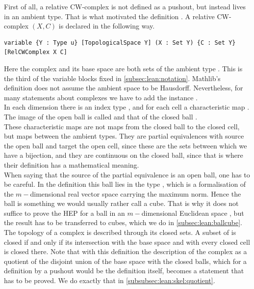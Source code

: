 \documentclass[11pt, a4paper, english]{article}
\theoremstyle{plain}
\theoremstyle{definition}
\theoremstyle{remark}
\numberwithin{equation}{section}
\numberwithin{theorem}{section}
\begin{document}
First of all, a relative CW-complex is not defined as a pushout, but instead lives in an ambient type. That is what motivated the definition . A relative CW-complex $(X,C)$ is declared in the following way. 
\begin{verbatim}
variable {Y : Type u} [TopologicalSpace Y] (X : Set Y) {C : Set Y} [RelCWComplex X C]
\end{verbatim}
Here the complex  and its base space  are both sets of the ambient type . This is the third of the variable blocks fixed in \cref{subsec:lean:notation}. Mathlib's definition does not assume the ambient space to be Hausdorff. Nevertheless, for many statements about complexes we have to add the instance \lean{[T2Space Y]}. \\
In each dimension there is an index type , and for each cell a characteristic map . The image of the open ball is called  and that of the closed ball . \\
These characteristic maps are not maps from the closed ball to the closed cell, but maps between the ambient types. They are partial equivalences with source the open ball and target the open cell, since these are the sets between which we have a bijection, and they are continuous on the closed ball, since that is where their definition has a mathematical meaning.\\
When saying that the source of the partial equivalence is an open ball, one has to be careful. In the definition this ball lies in the type , which is a formalisation of the $m-$dimensional real vector space carrying the maximum norm. Hence the ball is something we would usually rather call a cube. That is why it does not suffice to prove the HEP for a ball in an $m-$dimensional Euclidean space , but the result has to be transferred to cubes, which we do in \cref{subsec:lean:ballcube}.\\
The topology of a complex is described through its closed sets. A subset of  is closed if and only if its intersection with the base space and with every closed cell is closed there. Note that with this definition the description of the complex as a quotient of the disjoint union of the base space with the closed balls, which for a definition by a pushout would be the definition itself, becomes a statement that has to be proved. We do exactly that in \cref{subsubsec:lean:skel:quotient}. \\
\end{document}
